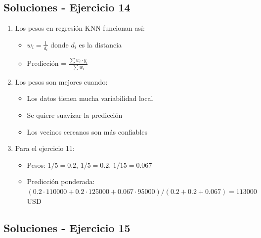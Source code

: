 \documentclass[12pt]{article}
\begin{document}
\subsection{Soluciones - Ejercicio 14}

\begin{enumerate}
    \item Los pesos en regresión KNN funcionan así:
    \begin{itemize}
        \item $w_i = \frac{1}{d_i}$ donde $d_i$ es la distancia
        \item Predicción = $\frac{\sum w_i \cdot y_i}{\sum w_i}$
    \end{itemize}
    \item Los pesos son mejores cuando:
    \begin{itemize}
        \item Los datos tienen mucha variabilidad local
        \item Se quiere suavizar la predicción
        \item Los vecinos cercanos son más confiables
    \end{itemize}
    \item Para el ejercicio 11:
    \begin{itemize}
        \item Pesos: $1/5 = 0.2$, $1/5 = 0.2$, $1/15 = 0.067$
        \item Predicción ponderada: $(0.2 \cdot 110000 + 0.2 \cdot 125000 + 0.067 \cdot 95000) / (0.2 + 0.2 + 0.067) = 113000$ USD
    \end{itemize}
\end{enumerate}

\subsection{Soluciones - Ejercicio 15}
\end{document}
